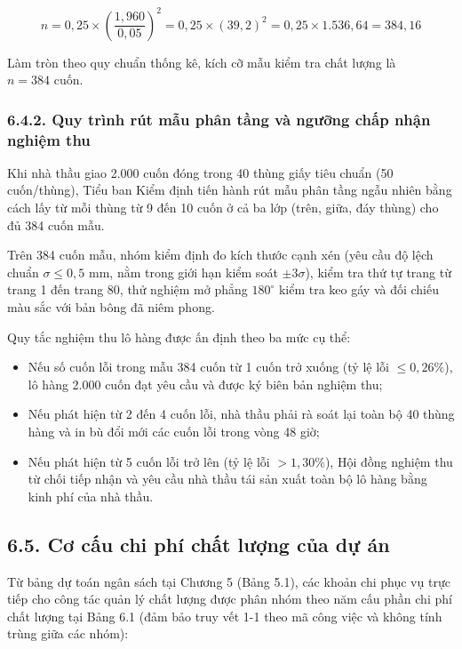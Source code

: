 \begin{equation}
n = 0,25 \times \left(\frac{1,960}{0,05}\right)^2 = 0,25 \times (39,2)^2 = 0,25 \times 1.536,64 = 384,16
\end{equation}

Làm tròn theo quy chuẩn thống kê, kích cỡ mẫu kiểm tra chất lượng là \textbf{$n = 384\text{ cuốn}$}.

\subsubsection{6.4.2. Quy trình rút mẫu phân tầng và ngưỡng chấp nhận nghiệm thu}

Khi nhà thầu giao 2.000 cuốn đóng trong 40 thùng giấy tiêu chuẩn (50 cuốn/thùng), Tiểu ban Kiểm định tiến hành rút mẫu phân tầng ngẫu nhiên bằng cách lấy từ mỗi thùng từ 9 đến 10 cuốn ở cả ba lớp (trên, giữa, đáy thùng) cho đủ 384 cuốn mẫu.

Trên 384 cuốn mẫu, nhóm kiểm định đo kích thước cạnh xén (yêu cầu độ lệch chuẩn $\sigma \le 0,5\text{ mm}$, nằm trong giới hạn kiểm soát $\pm 3\sigma$), kiểm tra thứ tự trang từ trang 1 đến trang 80, thử nghiệm mở phẳng $180^\circ$ kiểm tra keo gáy và đối chiếu màu sắc với bản bông đã niêm phong.

Quy tắc nghiệm thu lô hàng được ấn định theo ba mức cụ thể:
\begin{itemize}
    \item Nếu số cuốn lỗi trong mẫu 384 cuốn từ 1 cuốn trở xuống (tỷ lệ lỗi $\le 0,26\%$), lô hàng 2.000 cuốn đạt yêu cầu và được ký biên bản nghiệm thu;
    \item Nếu phát hiện từ 2 đến 4 cuốn lỗi, nhà thầu phải rà soát lại toàn bộ 40 thùng hàng và in bù đổi mới các cuốn lỗi trong vòng 48 giờ;
    \item Nếu phát hiện từ 5 cuốn lỗi trở lên (tỷ lệ lỗi $> 1,30\%$), Hội đồng nghiệm thu từ chối tiếp nhận và yêu cầu nhà thầu tái sản xuất toàn bộ lô hàng bằng kinh phí của nhà thầu.
\end{itemize}

\subsection{6.5. Cơ cấu chi phí chất lượng của dự án}

Từ bảng dự toán ngân sách tại Chương 5 (Bảng 5.1), các khoản chi phục vụ trực tiếp cho công tác quản lý chất lượng được phân nhóm theo năm cấu phần chi phí chất lượng tại Bảng 6.1 (đảm bảo truy vết 1-1 theo mã công việc và không tính trùng giữa các nhóm):

